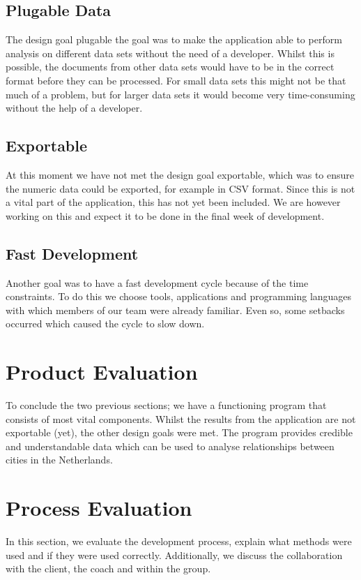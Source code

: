 \subsection{Plugable Data}
The design goal plugable the goal was to make the application able to perform analysis on different data sets without the need of a developer. Whilst this is possible, the documents from other data sets would have to be in the correct format before they can be processed. For small data sets this might not be that much of a problem, but for larger data sets it would become very time-consuming without the help of a developer.

\subsection{Exportable}
At this moment we have not met the design goal exportable, which was to ensure the numeric data could be exported, for example in CSV format. Since this is not a vital part of the application, this has not yet been included. We are however working on this and expect it to be done in the final week of development. 

\subsection{Fast Development}
Another goal was to have a fast development cycle because of the time constraints. To do this we choose tools, applications and programming languages with which members of our team were already familiar. Even so, some setbacks occurred which caused the cycle to slow down.

\section{Product Evaluation}
To conclude the two previous sections; we have a functioning program that consists of most vital components. Whilst the results from the application are not exportable (yet), the other design goals were met. The program provides credible and understandable data which can be used to analyse relationships between cities in the Netherlands.

\section{Process Evaluation}
In this section, we evaluate the development process, explain what methods were used and if they were used correctly. Additionally, we discuss the collaboration with the client, the coach and within the group.

